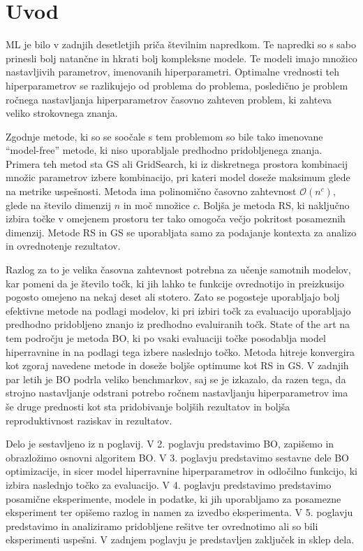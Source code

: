 \documentclass[a4paper, 12pt]{book}
\begin{document}
\mainmatter
\setcounter{page}{1}
\pagestyle{fancy}

\chapter{Uvod}
\par ML je bilo v zadnjih desetletjih priča številnim napredkom.
Te napredki so s sabo prinesli bolj natančne in hkrati bolj kompleksne modele.
Te modeli imajo množico nastavljivih parametrov, imenovanih hiperparametri.
Optimalne vrednosti teh hiperparametrov se razlikujejo od problema do problema, posledično je problem ročnega nastavljanja hiperparametrov časovno zahteven problem, ki zahteva veliko strokovnega znanja.
\par Zgodnje metode, ki so se soočale s tem problemom so bile tako imenovane ``model-free'' metode, ki niso uporabljale predhodno pridobljenega znanja.
 Primera teh metod sta GS ali GridSearch, ki iz diskretnega prostora kombinacij množic parametrov izbere kombinacijo, pri kateri model doseže maksimum glede na metrike uspešnosti.
Metoda ima polinomično časovno zahtevnost $\mathcal{O}(n^c)$, glede na število dimenzij $n$ in moč množice $c$. 
Boljša je metoda RS, ki naključno izbira točke v omejenem prostoru ter tako omogoča večjo pokritost posameznih dimenzij.
Metode RS in GS se uporabljata samo za podajanje kontexta za analizo in ovrednotenje rezultatov.
\par Razlog za to je velika  časovna zahtevnost potrebna za učenje samotnih modelov, kar pomeni da je število točk, ki jih lahko te funkcije ovrednotijo in preizkusijo pogosto omejeno na nekaj deset  ali stotero.
Zato se pogosteje uporabljajo bolj efektivne metode na podlagi modelov, ki pri izbiri točk za evaluacijo uporabljajo predhodno pridobljeno znanjo iz predhodno evaluiranih točk.
State of the art na tem področju je metoda BO, ki po vsaki evaluaciji točke posodablja model hiperravnine in na podlagi tega izbere naslednjo točko. 
Metoda hitreje konvergira kot zgoraj navedene metode in doseže boljše optimume kot RS in GS. 
V zadnjih par letih je BO podrla veliko benchmarkov, saj se je izkazalo, da razen tega, da strojno nastavljanje odstrani potrebo ročnem nastavljanju hiperparametrov ima še druge prednosti kot sta pridobivanje boljših rezultatov in boljša reproduktivnost raziskav in rezultatov.
\par Delo je sestavljeno iz n poglavij.
 V 2. poglavju predstavimo BO, zapišemo in obrazložimo osnovni algoritem BO.
 V 3. poglavju predstavimo sestavne dele BO optimizacije, in sicer model hiperravnine hiperparametrov in odločilno funkcijo, ki izbira naslednjo točko za evaluacijo.
 V 4. poglavju predstavimo predstavimo posamične eksperimente, modele in podatke, ki jih uporabljamo za posamezne eksperiment ter opišemo razlog in namen za izvedbo eksperimenta.
 V 5. poglavju predstavimo in analiziramo pridobljene rešitve ter ovrednotimo ali so bili eksperimenti uspešni.
 V zadnjem poglavju je predstavljen zaključek in sklep dela. 
\end{document}

